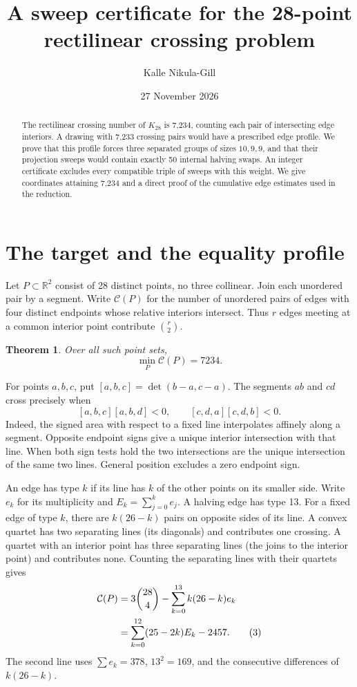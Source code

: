 \documentclass[11pt]{article}
\title{A sweep certificate for the 28-point rectilinear crossing problem}
\author{Kalle Nikula-Gill}
\date{27 November 2026}
\newtheorem{theorem}{Theorem}
\newcommand{\R}{\mathbb R}
\newcommand{\Cr}{\mathcal C}
\newcommand{\ornt}[3]{[#1,#2,#3]}
\begin{document}
\maketitle

\begin{abstract}
The rectilinear crossing number of \(K_{28}\) is 7,234, counting each pair of intersecting edge interiors. A drawing with 7,233 crossing pairs would have a prescribed edge profile. We prove that this profile forces three separated groups of sizes \(10,9,9\), and that their projection sweeps would contain exactly 50 internal halving swaps. An integer certificate excludes every compatible triple of sweeps with this weight. We give coordinates attaining 7,234 and a direct proof of the cumulative edge estimates used in the reduction.
\end{abstract}

\section{The target and the equality profile}
Let \(P\subset\R^2\) consist of 28 distinct points, no three collinear. Join each unordered pair by a segment. Write \(\Cr(P)\) for the number of unordered pairs of edges with four distinct endpoints whose relative interiors intersect. Thus \(r\) edges meeting at a common interior point contribute \(\binom r2\). \begin{theorem}\label{thm:main}
Over all such point sets,
\[
          \min_P \Cr(P)=7234.                                    \tag{1}
\]
\end{theorem}
For points \(a,b,c\), put \(\ornt abc=\det(b-a,c-a)\). The segments \(ab\) and \(cd\) cross precisely when
\[
 \ornt abc\ornt abd<0,\qquad \ornt cda\ornt cdb<0.                \tag{2}
\]
Indeed, the signed area with respect to a fixed line interpolates affinely along a segment. Opposite endpoint signs give a unique interior intersection with that line. When both sign tests hold the two intersections are the unique intersection of the same two lines. General position excludes a zero endpoint sign.

An edge has type \(k\) if its line has \(k\) of the other points on its smaller side. Write \(e_k\) for its multiplicity and \(E_k=\sum_{j=0}^k e_j\). A halving edge has type 13. For a fixed edge of type \(k\), there are \(k(26-k)\) pairs on opposite sides of its line. A convex quartet has two separating lines (its diagonals) and contributes one crossing. A quartet with an interior point has three separating lines (the joins to the interior point) and contributes none. Counting the separating lines with their quartets gives
\begin{align}
 \Cr(P)&=3\binom{28}{4}-\sum_{k=0}^{13} k(26-k)e_k\notag\\
       &=\sum_{k=0}^{12}(25-2k)E_k-2457 .                       \tag{3}
\end{align}
The second line uses \(\sum e_k=378\), \(13^2=169\), and the consecutive differences of \(k(26-k)\).
\end{document}
